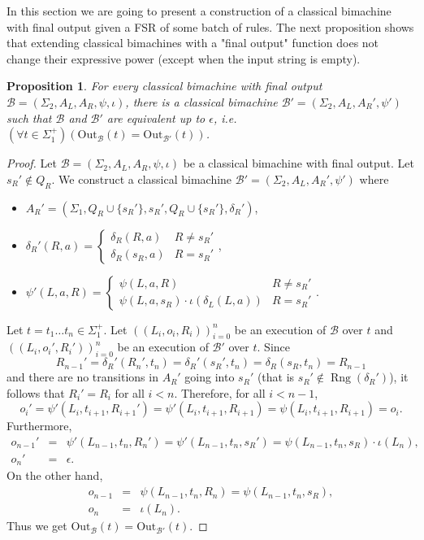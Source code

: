 \documentclass{article}
\newtheorem{proposition}[definition]{Proposition}
\DeclareMathOperator{\Rng}{Rng}
\begin{document}
	In this section we are going to present a construction of a classical bimachine with final output given a FSR of some batch of rules.
	The next proposition shows that extending classical bimachines with a "final output" function does not change their expressive power (except when the input string is empty).
	\begin{proposition} \label{prop:classical_bimachines_with_and_without_final_output_are_equivalent_up_to_epsilon}
		For every classical bimachine with final output $\mathcal{B} = (\Sigma_2, A_L, A_R, \psi, \iota)$, there is a classical bimachine $\mathcal{B'} = (\Sigma_2, A_L, A_R', \psi')$ such that $\mathcal{B}$ and $\mathcal{B}'$ are equivalent up to $\epsilon$, i.e.\ $(\forall t\in \Sigma_1^+)(\mathrm{Out}_\mathcal{B}(t) = \mathrm{Out}_\mathcal{B'}(t))$.
	\end{proposition}
	\begin{proof}
		Let $\mathcal{B} = (\Sigma_2, A_L, A_R, \psi, \iota)$ be a classical bimachine with final output. Let $s_R'\notin Q_R$.
		We construct a classical bimachine $\mathcal{B'} = (\Sigma_2, A_L, A_R', \psi')$ where
		\begin{itemize}
			\item \( A_R' = (\Sigma_1, Q_R\cup \{s_R'\}, s_R', Q_R\cup \{s_R'\}, \delta_R') \),
			\item \( \delta_R'(R, a) =
				\begin{cases}
					\delta_R(R, a) & R\ne s_R' \\
					\delta_R(s_R, a) & R = s_R'
				\end{cases}
			\),
			\item \( \psi'(L, a, R) =
				\begin{cases}
					\psi(L, a, R) & R\ne s_R' \\
					\psi(L, a, s_R)\cdot\iota(\delta_L(L, a)) & R = s_R'
				\end{cases}
			\).
		\end{itemize}
		Let $t=t_1\ldots t_n\in\Sigma_1^+$. Let $((L_i, o_i, R_i))_{i=0}^n$ be an execution of $\mathcal{B}$ over $t$ and $((L_i, o_i', R_i'))_{i=0}^n$ be an execution of $\mathcal{B}'$ over $t$. Since
		\[ R_{n-1}' = \delta_R'(R_n', t_n) = \delta_R'(s_R', t_n) = \delta_R(s_R, t_n) = R_{n-1} \]
		and there are no transitions in $A_R'$ going into $s_R'$ (that is $s_R'\notin \Rng(\delta_R')$), it follows that $R_i' = R_i$ for all $i<n$. Therefore, for all $i<n-1$,
		\[ o_i' = \psi'(L_i, t_{i+1}, R_{i+1}') = \psi'(L_i, t_{i+1}, R_{i+1}) = \psi(L_i, t_{i+1}, R_{i+1}) = o_i. \]
		Furthermore,
		\begin{eqnarray*}
			o_{n-1}' &=& \psi'(L_{n-1}, t_n, R_n') = \psi'(L_{n-1}, t_n, s_R') = \psi(L_{n-1}, t_n, s_R)\cdot \iota(L_n), \\
			o_n' &=& \epsilon.
		\end{eqnarray*}
		On the other hand,
		\begin{eqnarray*}
			o_{n-1} &=& \psi(L_{n-1}, t_n, R_n) = \psi(L_{n-1}, t_n, s_R), \\
			o_n &=& \iota(L_n).
		\end{eqnarray*}
		Thus we get
		\( \mathrm{Out}_\mathcal{B}(t) = \mathrm{Out}_\mathcal{B'}(t) \).
	\end{proof}
\end{document}
